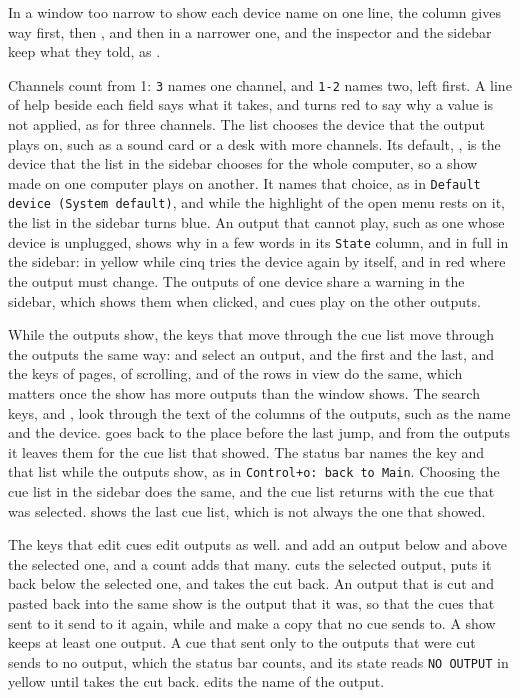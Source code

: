 In a window too narrow to show each device name on one line, the
 column gives way first, then , and then
 in a narrower one, and the inspector and the sidebar keep what
they told, as .

Channels count from 1: \texttt{3} names one channel, and \texttt{1-2} names
two, left first.  A line of help beside each field says what it takes, and
turns red to say why a value is not applied, as for three channels.  The
 list chooses the device that the output plays on, such as a sound
card or a desk with more channels.  Its default, , is the
device that the  list in the sidebar chooses for the whole
computer, so a show made on one computer plays on another.  It names that
choice, as in \texttt{Default device (System default)}, and while the
highlight of the open menu rests on it, the list in the sidebar turns blue.
An output that cannot play, such as one whose device is unplugged, shows why
in a few words in its \texttt{State} column, and in full in the sidebar: in
yellow while cinq tries the device again by itself, and in red where the
output must change.  The outputs of one device share a warning in the
sidebar, which shows them when clicked, and cues play on the other outputs.

While the outputs show, the keys that move through the cue list move through
the outputs the same way:  and  select an
output,  and  the first and the last, and the keys of pages,
of scrolling, and of the rows in view do the same, which matters once the
show has more outputs than the window shows.  The search keys, \key{/} and
, look through the text of the columns of the outputs, such as the name
and the device.   goes back to the place
before the last jump, and from the outputs it leaves them for the cue list
that showed.  The status bar names the key and that list while the outputs
show, as in \texttt{Control+o: back to Main}.  Choosing the cue list in the
sidebar does the same, and the cue list returns with the cue that was
selected.   shows the last cue list, which is not always the one that
showed.

The keys that edit cues edit outputs as well.   and
 add an output below and above the selected one, and a count adds that
many.   cuts the selected output,  puts it back below the
selected one, and  takes the cut back.  An output that is cut and
pasted back into the same show is the output that it was, so that the cues
that sent to it send to it again, while  and  make a copy that
no cue sends to.  A show keeps at least one output.  A cue that sent only to
the outputs that were cut sends to no output, which the status bar counts,
and its state reads \texttt{NO OUTPUT} in yellow until  takes the cut
back.   edits the name of the output.

